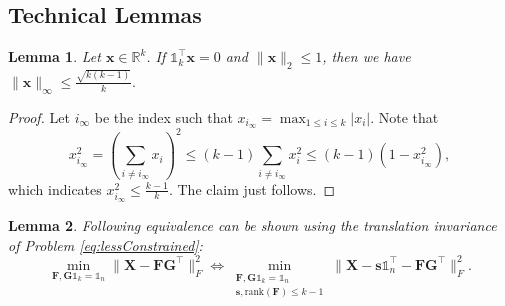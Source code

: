 \documentclass[journal]{IEEEtran}
\begin{document}
\subsection{Technical Lemmas}
\newtheorem{Lemma2}{\bf Lemma}
\begin{Lemma2}
	Let $\mathbf{x} \in \mathbb{R}^k$.
	If $\mathbb{1}_k^\top\mathbf{x}=0$ and $\|\mathbf{x}\|_2 \leq 1$, then we have $\|\mathbf{x}\|_\infty \leq \frac{\sqrt{k(k-1)}}{k}.$
\end{Lemma2}
\begin{proof}
	Let $i_\infty$ be the index such that $x_{i_\infty} = \max_{1\leq i \leq k} |x_i|$. Note that
	\[
	x_{i_\infty}^2 = \left( \sum_{i\neq i_\infty} x_i \right)^2 \leq (k-1)\sum_{i\neq i_\infty}x_i^2 \leq (k-1)(1-x_{i_\infty}^2),
	\]
	which indicates $x_{i_\infty}^2 \leq \frac{k-1}{k}$. The claim just follows.
\end{proof}
%
\begin{Lemma2}
	Following equivalence can be shown using the translation invariance of Problem \eqref{eq:lessConstrained}:
	\[
	\min_{\mathbf{F},\mathbf{G}\mathbb{1}_k = \mathbb{1}_n} \| \mathbf{X} - \mathbf{FG}^\top\|_F^2
	\Leftrightarrow
	\min_{\substack{\mathbf{F},\mathbf{G}\mathbb{1}_k = \mathbb{1}_n \\ \mathbf{s}, \text{rank}(\mathbf{F}) \leq k-1 }} \| \mathbf{X} - \mathbf{s}\mathbb{1}_n^\top- \mathbf{FG}^\top\|_F^2.
	\]
\end{Lemma2}
\end{document}
